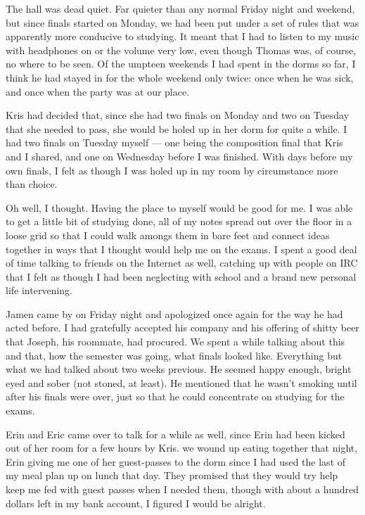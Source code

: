 The hall was dead quiet.  Far quieter than any normal Friday night and weekend, but since finals started on Monday, we had been put under a set of rules that was apparently more conducive to studying.  It meant that I had to listen to my music with headphones on or the volume very low, even though Thomas was, of course, no where to be seen.  Of the umpteen weekends I had spent in the dorms so far, I think he had stayed in for the whole weekend only twice: once when he was sick, and once when the party was at our place.

Kris had decided that, since she had two finals on Monday and two on Tuesday that she needed to pass, she would be holed up in her dorm for quite a while.  I had two finals on Tuesday myself --- one being the composition final that Kris and I shared, and one on Wednesday before I was finished.  With days before my own finals, I felt as though I was holed up in my room by circumstance more than choice.

Oh well, I thought.  Having the place to myself would be good for me.  I was able to get a little bit of studying done, all of my notes spread out over the floor in a loose grid so that I could walk amongs them in bare feet and connect ideas together in ways that I thought would help me on the exams.  I spent a good deal of time talking to friends on the Internet as well, catching up with people on IRC that I felt as though I had been neglecting with school and a brand new personal life intervening.

Jamen came by on Friday night and apologized once again for the way he had acted before.  I had gratefully accepted his company and his offering of shitty beer that Joseph, his roommate, had procured.  We spent a while talking about this and that, how the semester was going, what finals looked like.  Everything but what we had talked about two weeks previous.  He seemed happy enough, bright eyed and sober (not stoned, at least).  He mentioned that he wasn't smoking until after his finals were over, just so that he could concentrate on studying for the exams.

Erin and Eric came over to talk for a while as well, since Erin had been kicked out of her room for a few hours by Kris.  we wound up eating together that night, Erin giving me one of her guest-passes to the dorm since I had used the last of my meal plan up on lunch that day.  They promised that they would try help keep me fed with guest passes when I needed them, though with about a hundred dollars left in my bank account, I figured I would be alright.

